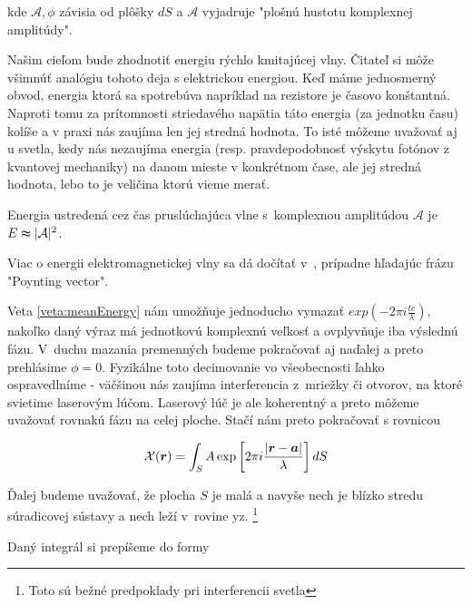 kde $\mathcal{A}, \phi$ závisia od plôšky $dS$ a $\mathcal{A}$
vyjadruje "plošnú hustotu komplexnej amplitúdy".

\begin{poznamka}
 Našim cieľom bude zhodnotiť energiu rýchlo kmitajúcej vlny.
 Čitateľ si môže všimnúť analógiu tohoto deja s elektrickou
 energiou. Keď máme jednosmerný obvod, energia ktorá sa spotrebúva
 napríklad na rezistore je časovo konštantná. Naproti tomu za
 prítomnosti striedavého napätia táto energia (za jednotku času) kolíše
 a v praxi nás zaujíma len jej stredná hodnota. To isté môžeme
 uvažovať aj u svetla, kedy nás nezaujíma energia (resp.
 pravdepodobnosť výskytu fotónov z kvantovej mechaniky) 
 na danom mieste v konkrétnom čase,
 ale jej stredná hodnota, lebo to je veličina ktorú vieme merať.
\end{poznamka}


\begin{veta}
Energia ustredená cez čas pruslúchajúca vlne s~komplexnou amplitúdou 
$\mathcal{A}$ je $E \thickapprox |\mathcal{A}|^2$.
\label{veta:meanEnergy}
\end{veta}

\begin{poznamka}
 Viac o energii elektromagnetickej vlny sa dá dočítať 
 v~\cite[str. 90-92]{eldyn}, prípadne hľadajúc frázu "Poynting vector".
\end{poznamka}

Veta \ref{veta:meanEnergy} nám umožňuje jednoducho vymazať
$exp(-2 \pi i \frac{tc}{\lambda})$, nakoľko daný výraz má
jednotkovú komplexnú veľkosť a ovplyvňuje iba výslednú fázu.
V~duchu mazania premenných budeme pokračovať aj
naďalej a preto prehlásime $\phi=0$. Fyzikálne toto decimovanie vo
všeobecnosti ľahko ospravedlníme - väčšinou nás zaujíma interferencia
z~mriežky či otvorov, na ktoré svietime laserovým lúčom. Laserový
lúč je ale koherentný a preto môžeme uvažovať rovnakú fázu na celej
ploche. Stačí nám preto pokračovať s rovnicou

\begin{equation}
\mathcal{X}(\boldsymbol{r})=\int_S
 A \exp \left[2 \pi i \frac{|\boldsymbol{r}-\boldsymbol{a}|}{\lambda} \right] dS
\end{equation}

Ďalej budeme uvažovať, že plocha $S$ je malá a navyše nech je
blízko stredu súradicovej sústavy a nech leží v~rovine yz.
\footnote{Toto sú bežné predpoklady pri interferencii svetla}

Daný integrál si prepíšeme do formy

